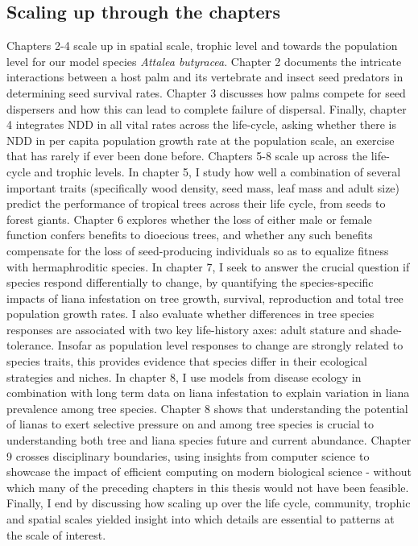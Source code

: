\documentclass[b5paper,justified]{tufte-book} %
\begin{document}
\begin{fullwidth}
\subsection{Scaling up through the chapters}
Chapters 2-4 scale up in spatial scale, trophic level and towards the population level for our model species \textit{Attalea butyracea}. Chapter 2 documents the intricate interactions between a host palm and its vertebrate and insect seed predators in determining seed survival rates.  Chapter 3 discusses how palms compete for seed dispersers and how this can lead to complete failure of dispersal. Finally, chapter 4 integrates NDD in all vital rates across the life-cycle, asking whether there is NDD in per capita population growth rate at the population scale, an exercise that has rarely if ever been done before. Chapters 5-8 scale up across the life-cycle and trophic levels. In chapter 5, I study how well a combination of several important traits (specifically wood density, seed mass, leaf mass and adult size) predict the performance of tropical trees across their life cycle, from seeds to forest giants. Chapter 6 explores whether the loss of either male or female function confers benefits to dioecious trees, and whether any such benefits compensate for the loss of seed-producing individuals so as to equalize fitness with hermaphroditic species. In chapter 7, I seek to answer the crucial question if species respond differentially to change, by quantifying the species-specific impacts of liana infestation on tree growth, survival, reproduction and total tree population growth rates.  I also evaluate whether differences in tree species responses are associated with two key life-history axes: adult stature and shade-tolerance. Insofar as population level responses to change are strongly related to species traits, this provides evidence that species differ in their ecological strategies and niches.  In chapter 8, I use models from disease ecology in combination with long term data on liana infestation to explain variation in liana prevalence among tree species. Chapter 8 shows that understanding the potential of lianas to exert selective pressure on and among tree species is crucial to understanding both tree and liana species future and current abundance.  Chapter 9 crosses disciplinary boundaries, using insights from computer science to showcase the impact of efficient computing on modern biological science - without which many of the preceding chapters in this thesis would not have been feasible. Finally, I end by discussing how scaling up over the life cycle, community, trophic and spatial scales yielded insight into which details are essential to patterns at the scale of interest. 
    

\end{fullwidth}
\end{document}
